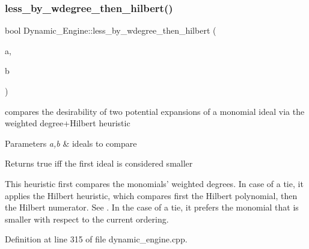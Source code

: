 \subsubsection{\texorpdfstring{less\+\_\+by\+\_\+wdegree\+\_\+then\+\_\+hilbert()}{less\_by\_wdegree\_then\_hilbert()}}
{\footnotesize\ttfamily bool Dynamic\+\_\+\+Engine\+::less\+\_\+by\+\_\+wdegree\+\_\+then\+\_\+hilbert (\begin{DoxyParamCaption}\item[{\hyperlink{group___g_b_computation_class_dynamic___engine_1_1_p_p___with___ideal}{P\+P\+\_\+\+With\+\_\+\+Ideal} \&}]{a,  }\item[{\hyperlink{group___g_b_computation_class_dynamic___engine_1_1_p_p___with___ideal}{P\+P\+\_\+\+With\+\_\+\+Ideal} \&}]{b }\end{DoxyParamCaption})}



compares the desirability of two potential expansions of a monomial ideal via the weighted degree+\+Hilbert heuristic 


\begin{DoxyParams}{Parameters}
{\em a,b} & ideals to compare \\
\hline
\end{DoxyParams}
\begin{DoxyReturn}{Returns}
{\ttfamily true} iff the first ideal is considered smaller
\end{DoxyReturn}
This heuristic first compares the monomials' weighted degrees. In case of a tie, it applies the Hilbert heuristic, which compares first the Hilbert polynomial, then the Hilbert numerator. See \cite{CaboaraDynAlg}. In the case of a tie, it prefers the monomial that is smaller with respect to the current ordering. 

Definition at line 315 of file dynamic\+\_\+engine.\+cpp.

